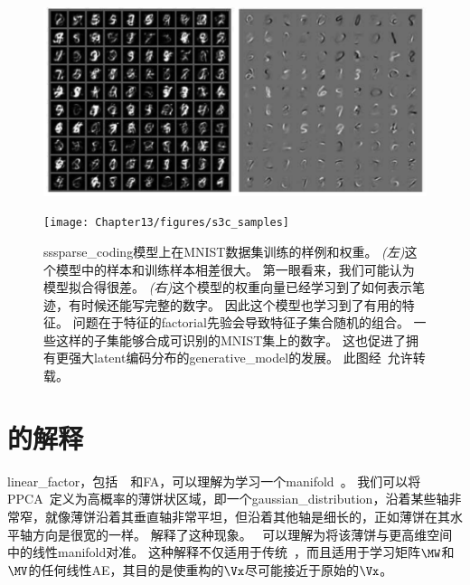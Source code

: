 \begin{figure}[!htb]
\ifOpenSource
\centerline{\includegraphics[scale=0.5]{images/116.png}}
\else
    \centerline{\texttt{[image: Chapter13/figures/s3c\_samples]}}
\fi
\caption{\gls{ss}\gls{sparse_coding}模型上在MNIST数据集训练的样例和权重。
\emph{(左)}这个模型中的样本和训练样本相差很大。
第一眼看来，我们可能认为模型拟合得很差。
\emph{(右)}这个模型的权重向量已经学习到了如何表示笔迹，有时候还能写完整的数字。
因此这个模型也学习到了有用的特征。
问题在于特征的\gls{factorial}先验会导致特征子集合随机的组合。
一些这样的子集能够合成可识别的MNIST集上的数字。
这也促进了拥有更强大\gls{latent}编码分布的\gls{generative_model}的发展。
此图经~\citet{Goodfeli-et-al-TPAMI-Deep-PrePrint-2013-small}允许转载。}
\label{fig:s3c_samples}
\end{figure}



\section{的解释}
\label{sec:manifold_interpretation_of_pca}


\gls{linear_factor}，包括~~和\gls{FA}，可以理解为学习一个\gls{manifold}~\citep{hinton97modelling}。
我们可以将\gls{PPCA}~定义为高概率的薄饼状区域，即一个\gls{gaussian_distribution}，沿着某些轴非常窄，就像薄饼沿着其垂直轴非常平坦，但沿着其他轴是细长的，正如薄饼在其水平轴方向是很宽的一样。
解释了这种现象。
~可以理解为将该薄饼与更高维空间中的线性\gls{manifold}对准。
这种解释不仅适用于传统~，而且适用于学习矩阵$\MW$和$\MV$的任何线性\gls{AE}，其目的是使重构的$\Vx$尽可能接近于原始的$\Vx$。

